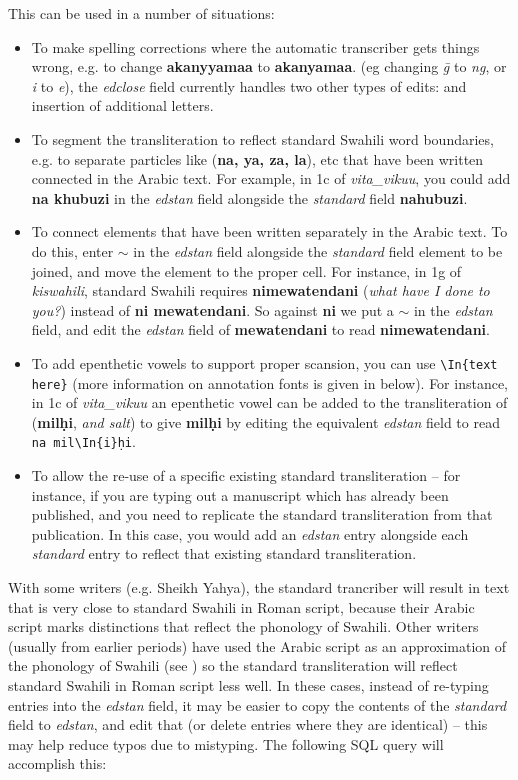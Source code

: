 This can be used in a number of situations:
\begin{itemize}
\item To make spelling corrections where the automatic transcriber gets things wrong, e.g. to change \textbf{akanyyamaa} to \textbf{akanyamaa}.
(eg changing \textit{ḡ} to \textit{ng}, or \textit{i} to \textit{e}), the \textit{edclose} field currently handles two other types of edits: and insertion of additional letters.
\item To segment the transliteration to reflect standard Swahili word boundaries, e.g. to separate particles like  (\textbf{na, ya, za, la}), etc that have been written connected in the Arabic text.  For example, in 1c of \textit{vita_vikuu}, you could add  \textbf{na khubuzi} in the \textit{edstan} field alongside the \textit{standard} field \textbf{nahubuzi}.
\item To connect elements that have been written separately in the Arabic text.  To do this, enter $\sim$ in the \textit{edstan} field alongside the \textit{standard} field element to be joined, and move the element to the proper cell.  For instance, in 1g of \textit{kiswahili}, standard Swahili requires \textbf{nimewatendani} (\textit{what have I done to you?}) instead of \textbf{ni mewatendani}.  So against \textbf{ni} we put a $\sim$ in the \textit{edstan} field, and edit the \textit{edstan} field of \textbf{mewatendani} to read \textbf{nimewatendani}.
\item To add epenthetic vowels to support proper scansion, you can use \verb|\In{text here}| (more information on annotation fonts is given in  below).  For instance, in 1c of \textit{vita_vikuu} an epenthetic vowel can be added to the transliteration of  (\textbf{milḥi}, \textit{and salt}) to give \textbf{milḥi} by editing the equivalent \textit{edstan} field to read \verb|na mil\In{i}ḥi|.
\item To allow the re-use of a specific existing standard transliteration -- for instance, if you are typing out a manuscript which
has already been published, and you need to replicate the standard transliteration from that publication. In this case, you would add an \textit{edstan} entry alongside each \textit{standard} entry to reflect that existing standard transliteration.
\end{itemize}

With some writers (e.g. Sheikh Yahya), the standard trancriber will result in text that is very close to standard Swahili in Roman script, because their Arabic script marks distinctions that reflect the phonology of Swahili.  Other writers (usually from earlier periods) have used the Arabic script as an approximation of the  phonology of Swahili (see ) so the standard transliteration will reflect standard Swahili in Roman script less well.  In these cases, instead of re-typing entries into the \textit{edstan} field,  it may be easier to copy the contents of the \textit{standard} field to \textit{edstan}, and edit that (or delete entries where they are identical) -- this
may help reduce typos due to mistyping.  The following SQL query will accomplish this:

